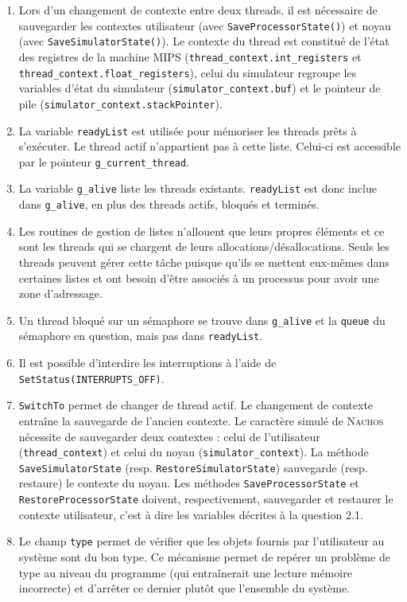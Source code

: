 \documentclass[a4paper,11pt,french]{article}
\begin{document}
\begin{enumerate}
\item Lors d'un changement de contexte entre deux threads, il est
  nécessaire de sauvegarder les contextes utilisateur (avec
  \texttt{SaveProcessorState()}) et noyau (avec
  \texttt{SaveSimulatorState()}). Le contexte du thread est constitué
  de l'état des registres de la machine MIPS
  (\texttt{thread\_context.int\_registers} et
  \texttt{thread\_context.float\_registers}), celui du simulateur
  regroupe les variables d'état du simulateur
  (\texttt{simulator\_context.buf}) et le pointeur de pile
  (\texttt{simulator\_context.stackPointer}).
\item La variable \texttt{readyList} est utilisée pour mémoriser les
  threads prêts à s'exécuter. Le thread actif n'appartient pas à cette
  liste. Celui-ci est accessible par le pointeur
  \texttt{g\_current\_thread}.
\item La variable \texttt{g\_alive} liste les threads
  existants. \texttt{readyList} est donc inclue dans
  \texttt{g\_alive}, en plus des threads actifs, bloqués et terminés.
\item Les routines de gestion de listes n'allouent que leurs propres
  éléments et ce sont les threads qui se chargent de leurs
  allocations/désallocations. Seuls les threads peuvent gérer cette
  tâche puisque qu'ils se mettent eux-mêmes dans certaines listes et
  ont besoin d'être associés à un processus pour avoir une zone
  d'adressage.
\item Un thread bloqué sur un sémaphore se trouve dans
  \texttt{g\_alive} et la \texttt{queue} du sémaphore en question,
  mais pas dans \texttt{readyList}.
\item Il est possible d'interdire les interruptions à l'aide de
  \texttt{SetStatus(INTERRUPTS\_OFF)}.
\item \texttt{SwitchTo} permet de changer de thread actif. Le
  changement de contexte entraîne la sauvegarde de l'ancien
  contexte. Le caractère simulé de \textsc{Nachos} nécessite de
  sauvegarder deux contextes : celui de l'utilisateur
  (\texttt{thread\_context}) et celui du noyau
  (\texttt{simulator\_context}). La méthode
  \texttt{SaveSimulatorState} (resp. \texttt{RestoreSimulatorState})
  sauvegarde (resp. restaure) le contexte du noyau. Les méthodes
  \texttt{SaveProcessorState} et \texttt{RestoreProcessorState}
  doivent, respectivement, sauvegarder et restaurer le contexte
  utilisateur, c'est à dire les variables décrites à la question 2.1.
\item Le champ \texttt{type} permet de vérifier que les objets fournis
  par l'utilisateur au système sont du bon type. Ce mécanisme permet
  de repérer un problème de type au niveau du programme (qui
  entraînerait une lecture mémoire incorrecte) et d'arrêter ce dernier
  plutôt que l'ensemble du système.
\end{enumerate}
\end{document}
